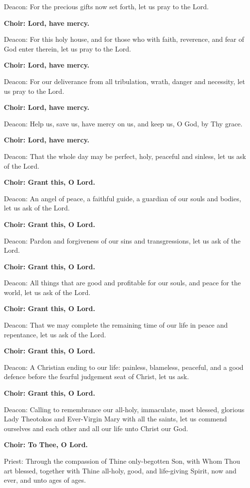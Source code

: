 \documentclass[12pt,a4paper,titlepage]{report}
\begin{document}
\begin{paracol}[1]{2}
	Deacon: For the precious gifts now set forth, let us pray to the Lord.
	
	\textbf{Choir: Lord, have mercy.}
	
	Deacon: For this holy house, and for those who with faith, reverence, and fear of God enter therein, let us pray to the Lord.
	
	\textbf{Choir: Lord, have mercy.}
	
	Deacon: For our deliverance from all tribulation, wrath, danger and necessity, let us pray to the Lord.
	
	\textbf{Choir: Lord, have mercy.}
	
	Deacon: Help us, save us, have mercy on us, and keep us, O God, by Thy grace.
	
	\textbf{Choir: Lord, have mercy.}
	
	Deacon: That the whole day may be perfect, holy, peaceful and sinless, let us ask of the Lord.
	
	\textbf{Choir: Grant this, O Lord.}
	
	Deacon: An angel of peace, a faithful guide, a guardian of our souls and bodies, let us ask of the Lord.
	
	\textbf{Choir: Grant this, O Lord.}
	
	Deacon: Pardon and forgiveness of our sins and transgressions, let us ask of the Lord.
	
	\textbf{Choir: Grant this, O Lord.}
	
	Deacon: All things that are good and profitable for our souls, and peace for the world, let us ask of the Lord.
	
	\textbf{Choir: Grant this, O Lord.}
	
	Deacon: That we may complete the remaining time of our life in peace and repentance, let us ask of the Lord.
	
	\textbf{Choir: Grant this, O Lord.}
	
	Deacon: A Christian ending to our life: painless, blameless, peaceful, and a good defence before the fearful judgement seat of Christ, let us ask.
	
	\textbf{Choir: Grant this, O Lord.}
	
	Deacon: Calling to remembrance our all-holy, immaculate, most blessed, glorious Lady Theotokos and Ever-Virgin Mary with all the saints, let us commend ourselves and each other and all our life unto Christ our God.
	
	\textbf{Choir: To Thee, O Lord.}
	
	Priest: Through the compassion of Thine only-begotten Son, with Whom Thou art blessed, together with Thine all-holy, good, and life-giving Spirit, now and ever, and unto ages of ages.
	

\end{paracol}
\end{document}

